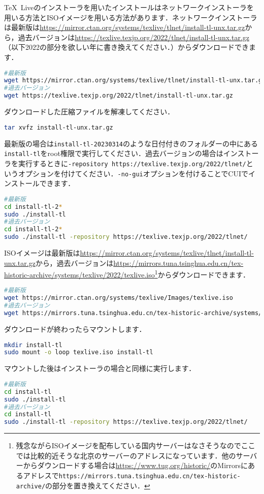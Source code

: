 \TeX\ Liveのインストーラを用いたインストールはネットワークインストーラを用いる方法とISOイメージを用いる方法があります．ネットワークインストーラは最新版は\url{https://mirror.ctan.org/systems/texlive/tlnet/install-tl-unx.tar.gz}から，過去バージョンは\url{https://texlive.texjp.org/2022/tlnet/install-tl-unx.tar.gz}（以下2022の部分を欲しい年に書き換えてください．）からダウンロードできます．
\begin{lstlisting}[language=bash]
#最新版
wget https://mirror.ctan.org/systems/texlive/tlnet/install-tl-unx.tar.gz
#過去バージョン
wget https://texlive.texjp.org/2022/tlnet/install-tl-unx.tar.gz
\end{lstlisting}
ダウンロードした圧縮ファイルを解凍してください．
\begin{lstlisting}[language=bash]
tar xvfz install-tl-unx.tar.gz
\end{lstlisting}
最新版の場合は\texttt{install-tl-20230314}のような日付付きのフォルダーの中にある\texttt{install-tl}をroot権限で実行してください．過去バージョンの場合はインストーラを実行するときに\texttt{-repository https://texlive.texjp.org/2022/tlnet/}というオプションを付けてください．\texttt{-no-gui}オプションを付けることでCUIでインストールできます．
\begin{lstlisting}[language=bash]
#最新版
cd install-tl-2*
sudo ./install-tl
#過去バージョン
cd install-tl-2*
sudo ./install-tl -repository https://texlive.texjp.org/2022/tlnet/
\end{lstlisting}
ISOイメージは最新版は\url{https://mirror.ctan.org/systems/texlive/tlnet/install-tl-unx.tar.gz}から，過去バージョンは\url{https://mirrors.tuna.tsinghua.edu.cn/tex-historic-archive/systems/texlive/2022/texlive.iso}\footnote{残念ながらISOイメージを配布している国内サーバーはなさそうなのでここでは比較的近そうな北京のサーバーのアドレスになっています．他のサーバーからダウンロードする場合は\url{https://www.tug.org/historic/}のMirrorsにあるアドレスで\texttt{https://mirrors.tuna.tsinghua.edu.cn/tex-historic-archive/}の部分を置き換えてください．}からダウンロードできます．
\begin{lstlisting}[language=bash]
#最新版
wget https://mirror.ctan.org/systems/texlive/Images/texlive.iso
#過去バージョン
wget https://mirrors.tuna.tsinghua.edu.cn/tex-historic-archive/systems/texlive/2022/texlive.iso
\end{lstlisting}
ダウンロードが終わったらマウントします．
\begin{lstlisting}[language=bash]
mkdir install-tl
sudo mount -o loop texlive.iso install-tl
\end{lstlisting}
マウントした後はインストーラの場合と同様に実行します．
\begin{lstlisting}[language=bash]
#最新版
cd install-tl
sudo ./install-tl
#過去バージョン
cd install-tl
sudo ./install-tl -repository https://texlive.texjp.org/2022/tlnet/
\end{lstlisting}

